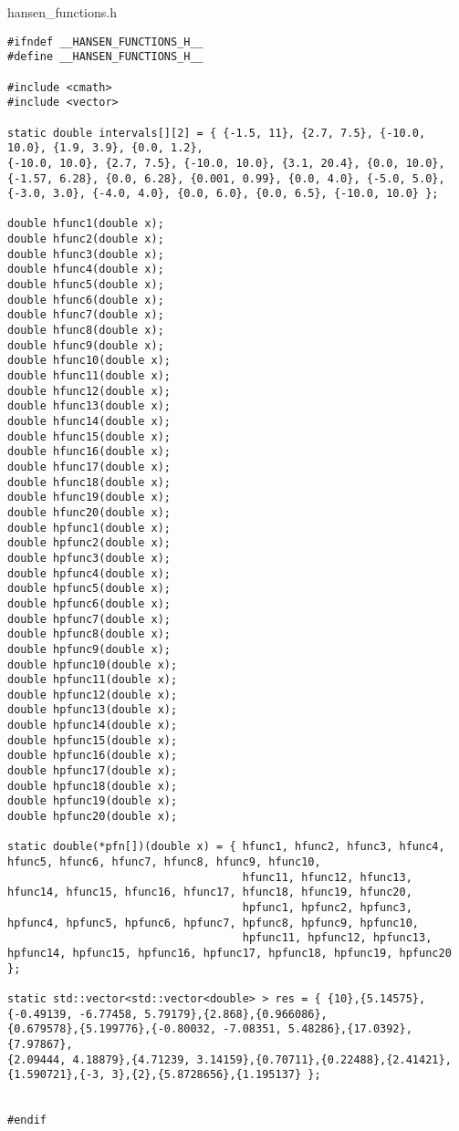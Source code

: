 \documentclass{report}
\begin{document}
hansen\_functions.h
\begin{lstlisting}
#ifndef __HANSEN_FUNCTIONS_H__
#define __HANSEN_FUNCTIONS_H__

#include <cmath>
#include <vector>

static double intervals[][2] = { {-1.5, 11}, {2.7, 7.5}, {-10.0, 10.0}, {1.9, 3.9}, {0.0, 1.2},
{-10.0, 10.0}, {2.7, 7.5}, {-10.0, 10.0}, {3.1, 20.4}, {0.0, 10.0},
{-1.57, 6.28}, {0.0, 6.28}, {0.001, 0.99}, {0.0, 4.0}, {-5.0, 5.0},
{-3.0, 3.0}, {-4.0, 4.0}, {0.0, 6.0}, {0.0, 6.5}, {-10.0, 10.0} };

double hfunc1(double x);
double hfunc2(double x);
double hfunc3(double x);
double hfunc4(double x);
double hfunc5(double x);
double hfunc6(double x);
double hfunc7(double x);
double hfunc8(double x);
double hfunc9(double x);
double hfunc10(double x);
double hfunc11(double x);
double hfunc12(double x);
double hfunc13(double x);
double hfunc14(double x);
double hfunc15(double x);
double hfunc16(double x);
double hfunc17(double x);
double hfunc18(double x);
double hfunc19(double x);
double hfunc20(double x);
double hpfunc1(double x);
double hpfunc2(double x);
double hpfunc3(double x);
double hpfunc4(double x);
double hpfunc5(double x);
double hpfunc6(double x);
double hpfunc7(double x);
double hpfunc8(double x);
double hpfunc9(double x);
double hpfunc10(double x);
double hpfunc11(double x);
double hpfunc12(double x);
double hpfunc13(double x);
double hpfunc14(double x);
double hpfunc15(double x);
double hpfunc16(double x);
double hpfunc17(double x);
double hpfunc18(double x);
double hpfunc19(double x);
double hpfunc20(double x);

static double(*pfn[])(double x) = { hfunc1, hfunc2, hfunc3, hfunc4, hfunc5, hfunc6, hfunc7, hfunc8, hfunc9, hfunc10,
                                    hfunc11, hfunc12, hfunc13, hfunc14, hfunc15, hfunc16, hfunc17, hfunc18, hfunc19, hfunc20,
                                    hpfunc1, hpfunc2, hpfunc3, hpfunc4, hpfunc5, hpfunc6, hpfunc7, hpfunc8, hpfunc9, hpfunc10,
                                    hpfunc11, hpfunc12, hpfunc13, hpfunc14, hpfunc15, hpfunc16, hpfunc17, hpfunc18, hpfunc19, hpfunc20 };

static std::vector<std::vector<double> > res = { {10},{5.14575},{-0.49139, -6.77458, 5.79179},{2.868},{0.966086},
{0.679578},{5.199776},{-0.80032, -7.08351, 5.48286},{17.0392},{7.97867},
{2.09444, 4.18879},{4.71239, 3.14159},{0.70711},{0.22488},{2.41421},
{1.590721},{-3, 3},{2},{5.8728656},{1.195137} };


#endif  
\end{lstlisting}
\end{document}
